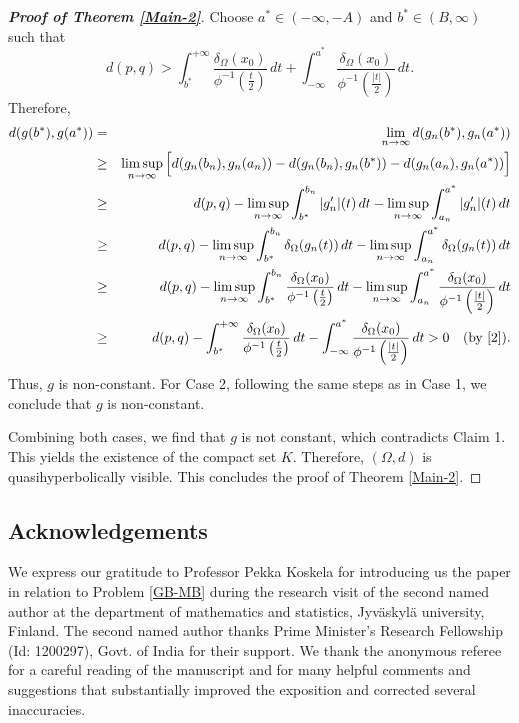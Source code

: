 \documentclass[a4paper,12pt]{amsart}
\theoremstyle{definition}
\begin{document}
\begin{proof}[\textbf{Proof of Theorem \ref{Main-2}}]
	Choose $a^*\in (-\infty,-A)$ and $b^*\in (B,\infty)$ such that
	\begin{equation}\label{2}
		d(p,q) >\int_{b^*}^{+\infty} \frac{\delta_{\Omega}(x_0)}{\phi^{-1}\left(\frac{t}{2}\right)}\,dt+\int_{-\infty}^{a^*} \frac{\delta_{\Omega}(x_0)}{\phi^{-1}\left(\frac{|t|}{2}\right)}\,dt.
	\end{equation}
	Therefore,
	\begin{eqnarray*}
		d(g(b^*), g(a^*))&=&\lim_{n\to \infty}d(g_{n}(b^*), g_n(a^*))\\
		&\geq& \limsup_{n \rightarrow \infty} \Big[d(g_{n}(b_{n}),g_{n}(a_{n})) - d(g_{n}(b_{n}),g_{n}(b^*)) - d(g_{n}(a_{n}),g_{n}(a^*))\Big]\\
		&\geq& d(p,q) - \limsup_{n\rightarrow \infty}\int_{b^*}^{b_{n}}|g_{n}'|(t)\,dt - \limsup_{n \rightarrow \infty}\int_{a_n}^{a^*} |g_{n}'|(t)\,dt\\
		&\ge&d(p,q)-\limsup_{n\to \infty}\int_{b^*}^{b_n}\delta_{\Omega}(g_n(t))\,dt-\limsup_{n\to \infty}\int_{a_n}^{a^*}\delta_{\Omega}(g_n(t))\,dt\\
		&\ge&d(p,q)-\limsup_{n \rightarrow \infty}\int_{b^*}^{b_n} \frac{\delta_{\Omega}(x_0)}{\phi^{-1}\left(\frac{t}{2}\right)}\,dt-\limsup_{n \rightarrow \infty}\int_{a_n}^{a^*} \frac{\delta_{\Omega}(x_0)}{\phi^{-1}\left(\frac{|t|}{2}\right)}\,dt\\
		&\ge&	d(p,q) -\int_{b^*}^{+\infty} \frac{\delta_{\Omega}(x_0)}{\phi^{-1}\left(\frac{t}{2}\right)}\,dt-\int_{-\infty}^{a^*} \frac{\delta_{\Omega}(x_0)}{\phi^{-1}\left(\frac{|t|}{2}\right)}\,dt>0 \quad (\mbox{by }\eqref{2}).
	\end{eqnarray*}
	Thus, $g$ is non-constant. For Case 2, following the same steps as in Case 1, we conclude that $g$ is non-constant.
	
	Combining both cases, we find that $g$ is not constant, which contradicts Claim 1. This yields the existence of the compact set $K$. Therefore, $(\Omega,d)$ is quasihyperbolically visible. This concludes the proof of Theorem \ref{Main-2}.
\end{proof}
	
	\subsection*{Acknowledgements}
	We express our gratitude to Professor Pekka Koskela for introducing us the paper \cite{Lammi-2011} in relation to Problem \ref{GB-MB} during the research visit of the second named author at the department of mathematics and statistics, Jyv\"askyl\"a university, Finland. The second named author thanks Prime Minister's Research Fellowship (Id: 1200297), Govt. of India for their support. We thank the anonymous referee for a careful reading of the manuscript and for many helpful comments and suggestions that substantially improved the exposition and corrected several inaccuracies.
	
\end{document}
